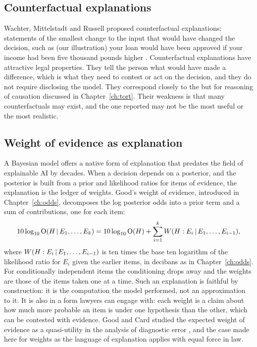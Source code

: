\subsection{Counterfactual explanations}

Wachter, Mittelstadt and Russell proposed counterfactual explanations: statements of the smallest change to the input that would have changed the decision, such as (our illustration) your loan would have been approved if your income had been five thousand pounds higher \citep{wachter2018}. Counterfactual explanations have attractive legal properties. They tell the person what would have made a difference, which is what they need to contest or act on the decision, and they do not require disclosing the model. They correspond closely to the but for reasoning of causation discussed in Chapter~\ref{ch:tort}. Their weakness is that many counterfactuals may exist, and the one reported may not be the most useful or the most realistic.

\subsection{Weight of evidence as explanation}

A Bayesian model offers a native form of explanation that predates the field of explainable AI by decades. When a decision depends on a posterior, and the posterior is built from a prior and likelihood ratios for items of evidence, the explanation is the ledger of weights. Good's weight of evidence, introduced in Chapter~\ref{ch:odds}, decomposes the log posterior odds into a prior term and a sum of contributions, one for each item:
\begin{equation}
\label{eq:woe-ledger}
10\log_{10}\mathrm{O}(H\,\vert\, E_1,\ldots,E_k) = 10\log_{10}\mathrm{O}(H) + \sum_{i=1}^k W(H : E_i \,\vert\, E_1,\ldots,E_{i-1}),
\end{equation}
where $W(H : E_i \,\vert\, E_1,\ldots,E_{i-1})$ is ten times the base ten logarithm of the likelihood ratio for $E_i$ given the earlier items, in decibans as in Chapter~\ref{ch:odds}. For conditionally independent items the conditioning drops away and the weights are those of the items taken one at a time. Such an explanation is faithful by construction: it is the computation the model performed, not an approximation to it. It is also in a form lawyers can engage with: each weight is a claim about how much more probable an item is under one hypothesis than the other, which can be contested with evidence. Good and Card studied the expected weight of evidence as a quasi-utility in the analysis of diagnostic error \citep{goodcard1971}, and the case made here for weights as the language of explanation applies with equal force in law.

